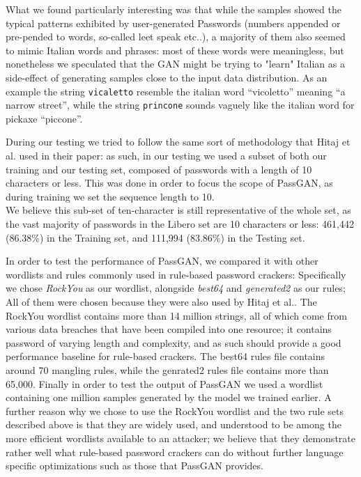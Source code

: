 What we found particularly interesting was that while the samples showed the typical patterns exhibited by user-generated Passwords (numbers appended or pre-pended to words, so-called leet speak etc..), a majority of them also seemed to mimic Italian words and phrases: most of these words were meaningless, but nonetheless we speculated that the GAN might be trying to "learn" Italian as a side-effect of generating samples close to the input data distribution.
As an example the string \texttt{vicaletto} resemble the italian word \enquote{vicoletto} meaning \enquote{a narrow street}, while the string \texttt{princone} sounds vaguely like the italian word for pickaxe \enquote{piccone}. 

During our testing we tried to follow the same sort of methodology that Hitaj et al.\cite{PassGAN} used in their paper: as such, in our testing we used a subset of both our training  and our testing set, composed of passwords with a length of 10 characters or less. This was done in order to focus the scope of PassGAN, as during training we set the sequence length to 10.\\ %
We believe this sub-set of ten-character is still representative of the whole set, as the vast majority of passwords in the Libero set are 10 characters or less: 461,442 (86.38\%) in the Training set, and 111,994 (83.86\%) in the Testing set. 

In order to test the performance of PassGAN, we compared it with other wordlists and rules commonly used in rule-based password crackers: Specifically we chose \emph{RockYou} as our wordlist, alongside \emph{best64} and \emph{generated2} as our rules; All of them were chosen because they were also used by Hitaj et al.\cite{PassGAN}.
The RockYou wordlist contains more than 14 million strings, all of which come from various data breaches that have been compiled into one resource; it contains password of varying length and complexity, and as such should provide a good performance baseline for rule-based crackers. The best64 rules file contains around 70 mangling rules, while the genrated2 rules file contains more than 65,000. 
Finally in order to test the output of PassGAN we used a wordlist containing one million samples generated by the model we trained earlier.
A further reason why we chose to use the RockYou wordlist and the two rule sets described above is that they are widely used, and understood to be among the more efficient wordlists available to an attacker; we believe that they demonstrate rather well what rule-based password crackers can do without further language specific optimizations such as those that PassGAN provides.

